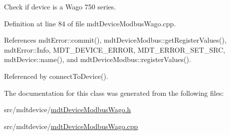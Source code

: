 Check if device is a Wago 750 series. 



Definition at line 84 of file mdt\-Device\-Modbus\-Wago.\-cpp.



References mdt\-Error\-::commit(), mdt\-Device\-Modbus\-::get\-Register\-Values(), mdt\-Error\-::\-Info, M\-D\-T\-\_\-\-D\-E\-V\-I\-C\-E\-\_\-\-E\-R\-R\-O\-R, M\-D\-T\-\_\-\-E\-R\-R\-O\-R\-\_\-\-S\-E\-T\-\_\-\-S\-R\-C, mdt\-Device\-::name(), and mdt\-Device\-Modbus\-::register\-Values().



Referenced by connect\-To\-Device().



The documentation for this class was generated from the following files\-:\begin{DoxyCompactItemize}
\item 
src/mdtdevice/\hyperlink{mdt_device_modbus_wago_8h}{mdt\-Device\-Modbus\-Wago.\-h}\item 
src/mdtdevice/\hyperlink{mdt_device_modbus_wago_8cpp}{mdt\-Device\-Modbus\-Wago.\-cpp}\end{DoxyCompactItemize}
